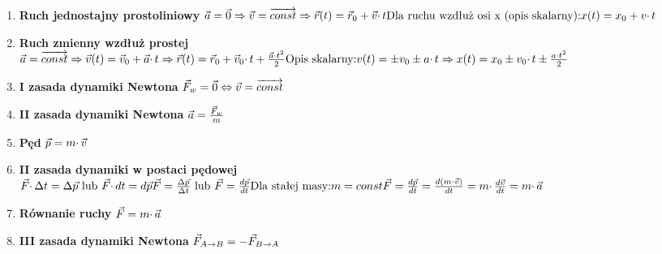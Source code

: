 \documentclass{article}
\begin{document}
\begin{enumerate}
		\item \textbf{Ruch jednostajny prostoliniowy} $ \newline
		\vec{a} = \vec{0} \Rightarrow \vec{v} = \overrightarrow{const} \Rightarrow \vec{r}(t) = \vec{r}_0 + \vec{v} \cdotp t
		\newline
		\text{Dla ruchu wzdłuż osi x (opis skalarny):}
		\newline
		x(t) = x_0 + v \cdotp t
		$
		
		\item \textbf{Ruch zmienny wzdłuż prostej} $ \newline
		\vec{a} = \overrightarrow{const} \Rightarrow \vec{v}(t) = \vec{v}_0 + \vec{a} \cdotp t \Rightarrow \vec{r}(t) = \vec{r}_0 + \vec{v}_0 \cdotp t + \frac{\vec{a} \cdotp t^2}{2}
		\newline
		\text{Opis skalarny:}
		\newline
		v(t) = \pm v_0 \pm a \cdotp t \Rightarrow x(t) = x_0 \pm v_0 \cdotp t \pm \frac{a \cdotp t^2}{2}
		$
		
		\item \textbf{I zasada dynamiki Newtona} $ \newline
		\vec{F}_w = \vec{0} \Leftrightarrow \vec{v} = \overrightarrow{const}
		$
		
		\item \textbf{II zasada dynamiki Newtona} $ \newline
		\vec{a} = \frac{\vec{F}_w}{m}
		$
		
		\item \textbf{Pęd} $ \newline
		\vec{p} = m \cdotp \vec{v}
		$
		
		\item \textbf{II zasada dynamiki w postaci pędowej} $ \newline
		\vec{F} \cdotp \Delta t = \Delta \vec{p} \text{ lub } \vec{F} \cdotp dt = d \vec{p}
		\newline
		\vec{F} = \frac{\Delta \vec{p}}{\Delta t} \text{ lub } \vec{F} = \frac{d \vec{p}}{dt}
		\newline
		\text{Dla stałej masy:}
		\newline
		m = const
		\newline
		\vec{F} = \frac{d \vec{p}}{dt} = \frac{d(m \cdotp \vec{v})}{dt} = m \cdotp \frac{d \vec{v}}{dt} = m \cdotp \vec{a}
		$
		
		\item \textbf{Równanie ruchy} $ \newline
		\vec{F} = m \cdotp \vec{a}
		$
		
		\item \textbf{III zasada dynamiki Newtona} $ \newline
		\vec{F}_{A \rightarrow B} = -\vec{F}_{B \rightarrow A}
		$
		
	\end{enumerate}
	
\end{document}

